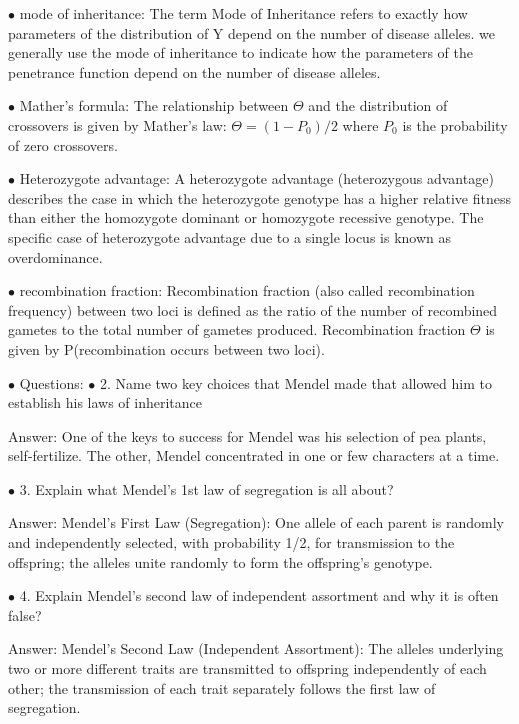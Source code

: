 \documentclass{article}
\begin{document}
\vspace{0.1in}
$\bullet$ mode of inheritance:
The term Mode of Inheritance refers to exactly how parameters of the distribution of Y depend on the number of disease alleles.
we generally use the mode of inheritance to indicate how the parameters of the penetrance function depend on the number of disease alleles. 


\vspace{0.1in}
$\bullet$ Mather's formula:
The relationship between $\Theta $ and the distribution of crossovers is given by
Mather’s law: $\Theta = (1 - P_0)/2 $
where $P_0$ is the probability of zero crossovers.


\vspace{0.1in}
$\bullet$ Heterozygote advantage:
A heterozygote advantage (heterozygous advantage) describes the case in which the heterozygote genotype has a higher relative fitness than either the homozygote dominant or homozygote recessive genotype. The specific case of heterozygote advantage due to a single locus is known as overdominance.


\vspace{0.1in}
$\bullet$ recombination fraction:
Recombination fraction (also called recombination frequency) between two loci
is defined as the ratio of the number of recombined gametes to the total number
of gametes produced.
Recombination fraction $\Theta $ is given by P(recombination occurs between two loci).


\vspace{2pc}
$\bullet$ Questions:
$\bullet$ 2. Name two key choices that Mendel made that allowed him to establish his
laws of inheritance

Answer:
One of the keys to success for Mendel was his selection of pea plants, self-fertilize. 
The other, Mendel concentrated in one or few characters at a time.


\vspace{0.1in}
$\bullet$ 3. Explain what Mendel's 1st law of segregation is all about?

Answer: Mendel’s First Law (Segregation): One allele of each parent is randomly and independently selected, with probability 1/2, for transmission to the offspring; the alleles unite randomly to form the offspring’s genotype.


\vspace{0.1in} 
$\bullet$ 4. Explain Mendel's second law of independent assortment and why it is often false?

Answer: Mendel’s Second Law (Independent Assortment): The alleles underlying two or
more different traits are transmitted to offspring independently of each other; the
transmission of each trait separately follows the first law of segregation.
\end{document}
